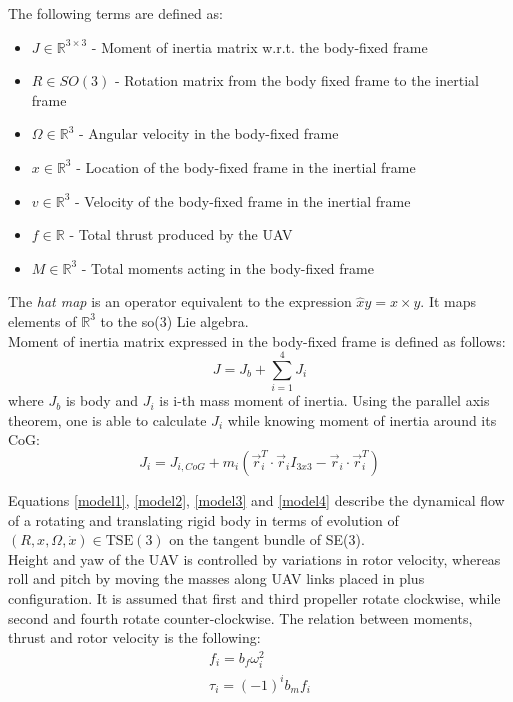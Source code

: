 \noindent The following terms are defined as:

\begin{itemize}
	\item $J \in \mathbb{R}^{3 \times 3}$ - Moment of inertia matrix w.r.t. the body-fixed frame
	
	\item $R \in SO(3)$ - Rotation matrix from the body fixed frame to the inertial frame
	
	\item $\Omega \in \mathbb{R}^3$ - Angular velocity in the body-fixed frame
	
	\item $x \in \mathbb{R}^3$ - Location of the body-fixed frame in the inertial frame
	
	\item $v \in \mathbb{R}^3$ - Velocity of the body-fixed frame in the inertial frame
	
	\item $f \in \mathbb{R}$ - Total thrust produced by the UAV
	
	\item $M \in \mathbb{R}^3$ - Total moments acting in the body-fixed frame
\end{itemize}

\noindent The \textit{hat map} is an operator equivalent to the expression $\hat{x}y = x \times y$. It maps elements of $\mathbb{R}^3$ to the so(3) Lie algebra. \\
Moment of inertia matrix expressed in the body-fixed frame is defined as follows:
\begin{equation}
	J = J_b + \sum_{i=1}^{4}J_i
\end{equation}
where $J_b$ is body and $J_i$ is i-th mass moment of inertia. Using the parallel axis theorem, one is able to calculate $J_i$ while knowing moment of inertia around its CoG:
\begin{equation}
	J_i = J_{i,CoG} + m_i(\vec{r}_i^T \cdot \vec{r}_i I_{3x3} - \vec{r}_i \cdot \vec{r}_i^T)
\end{equation}

\indent Equations \ref{model1}, \ref{model2}, \ref{model3} and \ref{model4} describe the dynamical flow of a rotating and translating rigid body in terms of evolution of $(R,x,\Omega,\dot{x})\in \text{TSE}(3)$ on the tangent bundle of SE(3). \\
\indent Height and yaw of the UAV is controlled by variations in rotor velocity, whereas roll and pitch by moving the masses along UAV links placed in plus configuration. It is assumed that first and third propeller rotate clockwise, while second and fourth rotate counter-clockwise. The relation between moments, thrust and rotor velocity is the following:
\begin{gather}
	f_i = b_f \omega_{i}^2 \label{force}\\
	\tau_i = (-1)^i b_m f_i
\end{gather}

